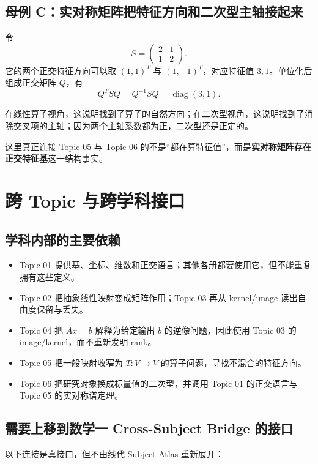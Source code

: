 \documentclass[11pt,a4paper]{ctexart}
\newcommand{\kw}[1]{\textbf{\color{deep}#1}}
\begin{document}
\subsection{母例 C：实对称矩阵把特征方向和二次型主轴接起来}

令
\[
S=\begin{pmatrix}2&1\\1&2\end{pmatrix}.
\]
它的两个正交特征方向可以取 $(1,1)^T$ 与 $(1,-1)^T$，对应特征值 $3,1$。单位化后组成正交矩阵 $Q$，有
\[
Q^TSQ=Q^{-1}SQ=\operatorname{diag}(3,1).
\]

在线性算子视角，这说明找到了算子的自然方向；在二次型视角，这说明找到了消除交叉项的主轴；因为两个主轴系数都为正，二次型还是正定的。

这里真正连接 Topic 05 与 Topic 06 的不是“都在算特征值”，而是\kw{实对称矩阵存在正交特征基}这一结构事实。

\section{跨 Topic 与跨学科接口}

\subsection{学科内部的主要依赖}

\begin{itemize}
  \item Topic 01 提供基、坐标、维数和正交语言；其他各册都要使用它，但不能重复拥有这些定义。
  \item Topic 02 把抽象线性映射变成矩阵作用；Topic 03 再从 kernel/image 读出自由度保留与丢失。
  \item Topic 04 把 $Ax=b$ 解释为给定输出 $b$ 的逆像问题，因此使用 Topic 03 的 image/kernel，而不重新发明 rank。
  \item Topic 05 把一般映射收窄为 $T:V\to V$ 的算子问题，寻找不混合的特征方向。
  \item Topic 06 把研究对象换成标量值的二次型，并调用 Topic 01 的正交语言与 Topic 05 的实对称谱定理。
\end{itemize}

\subsection{需要上移到数学一 Cross-Subject Bridge 的接口}

以下连接是真接口，但不由线代 Subject Atlas 重新展开：
\end{document}
